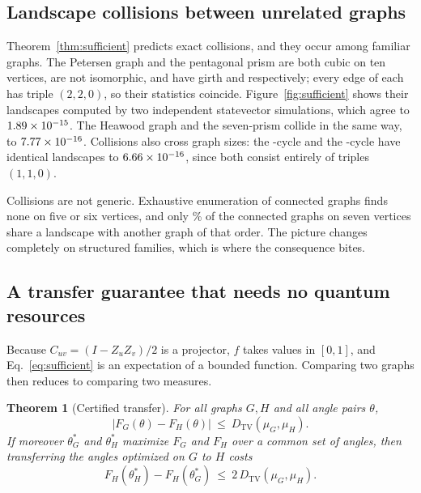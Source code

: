 \documentclass[10pt,letterpaper]{article}
\newtheorem{theorem}{Theorem}
\theoremstyle{definition}
\newcommand{\Dtv}{D_{\mathrm{TV}}}
\begin{document}
\subsection{Landscape collisions between unrelated graphs}

Theorem~\ref{thm:sufficient} predicts exact collisions, and they occur among
familiar graphs. The Petersen graph and the pentagonal prism are both cubic on
ten vertices, are not isomorphic, and have girth \PetGa{} and \PetGb{}
respectively; every edge of each has triple $(2,2,0)$, so their statistics
coincide. Figure~\ref{fig:sufficient} shows their landscapes computed by two
independent statevector simulations, which agree to $1.89\times10^{-15}$. The Heawood
graph and the seven-prism collide in the same way, to $7.77\times10^{-16}$. Collisions
also cross graph sizes: the \CycNa-cycle and the \CycNb-cycle have identical
landscapes to $6.66\times10^{-16}$, since both consist entirely of triples $(1,1,0)$.

Collisions are not generic. Exhaustive enumeration of connected graphs finds
none on five or six vertices, and only \CenShareSeven\% of the \CenGSeven{} connected
graphs on seven vertices share a landscape with another graph of that order.
The picture changes completely on structured families, which is where the
consequence bites.

\subsection{A transfer guarantee that needs no quantum resources}

Because $C_{uv}=(I-Z_uZ_v)/2$ is a projector, $f$ takes values in $[0,1]$, and
Eq.~\eqref{eq:sufficient} is an expectation of a bounded function. Comparing
two graphs then reduces to comparing two measures.

\begin{theorem}[Certified transfer]
\label{thm:transfer}
For all graphs $G,H$ and all angle pairs $\theta$,
\begin{equation}
 |F_G(\theta)-F_H(\theta)|\ \le\ \Dtv(\mu_G,\mu_H).
 \label{eq:supbound}
\end{equation}
If moreover $\theta^*_G$ and $\theta^*_H$ maximize $F_G$ and $F_H$ over a
common set of angles, then transferring the angles optimized on $G$ to $H$
costs
\begin{equation}
 F_H(\theta^*_H)-F_H(\theta^*_G)\ \le\ 2\,\Dtv(\mu_G,\mu_H).
 \label{eq:transferbound}
\end{equation}
\end{theorem}
\end{document}
